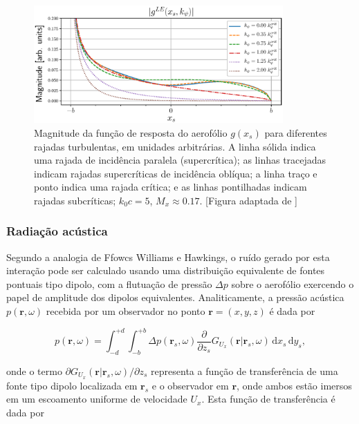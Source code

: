\documentclass[a4paper, 11pt, twoside]{article}
\newcommand{\ud}{\,\mathrm{d}}
\begin{document}
\begin{figure}
	\centering
	\includegraphics[width=0.85\textwidth]{../figures/Abs_gLE_ky_kc50.eps}
	\caption{Magnitude da função de resposta do aerofólio $g(x_s)$ para diferentes rajadas turbulentas, em unidades arbitrárias. A linha sólida indica uma rajada de incidência paralela (supercrítica); as linhas tracejadas indicam rajadas supercríticas de incidência oblíqua; a linha traço e ponto indica uma rajada crítica; e as linhas pontilhadas indicam rajadas subcríticas; $k_0 c = 5$, $M_x \approx 0.17$. [Figura adaptada de \citet{Roger13}]}
	\label{fig:Abs_gLE_kc50}
\end{figure}

\subsubsection{Radiação acústica}

Segundo a analogia de Ffowcs Williams e Hawkings, o ruído gerado por esta interação pode ser calculado usando uma distribuição equivalente de fontes pontuais tipo dipolo, com a flutuação de pressão $\Delta p$ sobre o aerofólio exercendo o papel de amplitude dos dipolos equivalentes. Analiticamente, a pressão acústica $p(\mathbf{r}, \omega)$ recebida por um observador no ponto $\mathbf{r} = (x, y, z)$ é dada por

\begin{equation}
	p(\mathbf{r}, \omega) = \int_{-d}^{+d} \int_{-b}^{+b} \Delta p(\mathbf{r}_s, \omega) \frac{\partial }{\partial z_s} G_{U_x}(\mathbf{r} | \mathbf{r}_s, \omega) \ud x_s \ud y_s,
	\label{eq:ac_radiation_single_gust}
\end{equation}

\noindent onde o termo $\partial G_{U_x}(\mathbf{r} | \mathbf{r}_s, \omega) / \partial z_s$ representa a função de transferência de uma fonte tipo dipolo localizada em $\mathbf{r}_s$ e o observador em $\mathbf{r}$, onde ambos estão imersos em um escoamento uniforme de velocidade $U_x$. Esta função de transferência é dada por
\end{document}
